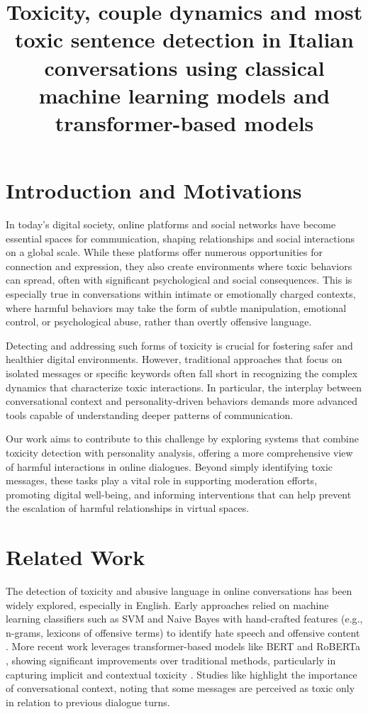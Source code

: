 \documentclass[conference]{IEEEtran}
\title{Toxicity, couple dynamics and most toxic sentence detection in Italian conversations using classical machine learning models and transformer-based models}
\author{
\IEEEauthorblockN{Davide Cirilli}
\IEEEauthorblockA{
Università degli Studi di Bari Aldo Moro \\
Email: d.cirilli2@studenti.uniba.it}
}
\begin{document}
\maketitle
\IEEEdisplaynontitleabstractindextext

\section{Introduction and Motivations}

In today’s digital society, online platforms and social networks have become essential spaces for communication, shaping relationships and social interactions on a global scale. While these platforms offer numerous opportunities for connection and expression, they also create environments where toxic behaviors can spread, often with significant psychological and social consequences. This is especially true in conversations within intimate or emotionally charged contexts, where harmful behaviors may take the form of subtle manipulation, emotional control, or psychological abuse, rather than overtly offensive language.

Detecting and addressing such forms of toxicity is crucial for fostering safer and healthier digital environments. However, traditional approaches that focus on isolated messages or specific keywords often fall short in recognizing the complex dynamics that characterize toxic interactions. In particular, the interplay between conversational context and personality-driven behaviors demands more advanced tools capable of understanding deeper patterns of communication.

Our work aims to contribute to this challenge by exploring systems that combine toxicity detection with personality analysis, offering a more comprehensive view of harmful interactions in online dialogues. Beyond simply identifying toxic messages, these tasks play a vital role in supporting moderation efforts, promoting digital well-being, and informing interventions that can help prevent the escalation of harmful relationships in virtual spaces.

\section{Related Work}

The detection of toxicity and abusive language in online conversations has been widely explored, especially in English. Early approaches relied on machine learning classifiers such as SVM and Naive Bayes with hand-crafted features (e.g., n-grams, lexicons of offensive terms) to identify hate speech and offensive content \cite{AbusiveLanguageDetection2016} \cite{AutomatedHateSpeech2017}. More recent work leverages transformer-based models like BERT \cite{BERT2018} and RoBERTa \cite{RoBERTa2019}, showing significant improvements over traditional methods, particularly in capturing implicit and contextual toxicity \cite{HateSpeechDetectionSurvey2017}. Studies like \cite{ToxicityDetectionContext2021} highlight the importance of conversational context, noting that some messages are perceived as toxic only in relation to previous dialogue turns.
\end{document}
